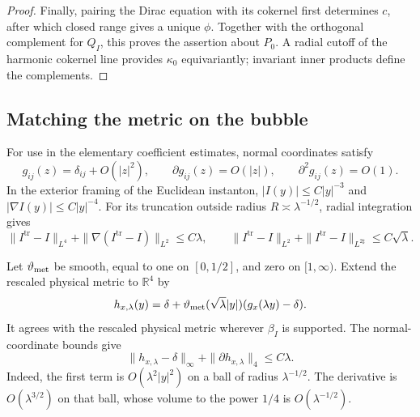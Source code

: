 \documentclass[11pt]{amsart}
\theoremstyle{definition}
\theoremstyle{remark}
\theoremstyle{plain}
\newcommand{\RR}{\mathbb{R}}
\begin{document}
\begin{proof}
Finally, pairing the Dirac equation with its cokernel first determines
$c$, after which closed range gives a unique $\phi$.  Together with
the orthogonal complement for $Q_I$, this proves the assertion about
$P_0$.  A radial cutoff of the harmonic cokernel line provides
$\kappa_0$ equivariantly; invariant inner products define the complements.
\end{proof}

\subsection{Matching the metric on the bubble}

For use in the elementary coefficient estimates, normal coordinates satisfy
\begin{equation}\label{eq:normal-coordinate-metric}
 g_{ij}(z)=\delta_{ij}+O(|z|^2),\qquad
 \partial g_{ij}(z)=O(|z|),\qquad \partial^2g_{ij}(z)=O(1).
\end{equation}
In the exterior framing of the Euclidean instanton,
$|I(y)|\leq C|y|^{-3}$ and $|\nabla I(y)|\leq C|y|^{-4}$.
For its truncation outside radius $R\asymp\lambda^{-1/2}$, radial
integration gives
\begin{equation}\label{eq:instanton-tail}
 \|I^{\mathrm{tr}}-I\|_{L^4}
 +\|\nabla(I^{\mathrm{tr}}-I)\|_{L^2}\leq C\lambda,
 \qquad
 \|I^{\mathrm{tr}}-I\|_{L^2}
 +\|I^{\mathrm{tr}}-I\|_{L^{2\sharp}}\leq C\sqrt\lambda.
\end{equation}

Let $\vartheta_{\rm met}$ be smooth, equal to one on $[0,1/2]$, and zero
on $[1,\infty)$.  Extend the rescaled physical metric to $\RR^4$ by
\begin{equation}\label{eq:euclidean-induced-metric}
 h_{x,\lambda}(y)=\delta+
 \vartheta_{\rm met}(\sqrt\lambda|y|)(g_x(\lambda y)-\delta).
\end{equation}
It agrees with the rescaled physical metric wherever $\beta_I$ is supported.
The normal-coordinate bounds give
\begin{equation}\label{eq:euclidean-metric-bound}
 \|h_{x,\lambda}-\delta\|_\infty+
 \|\partial h_{x,\lambda}\|_4\leq C\lambda.
\end{equation}
Indeed, the first term is $O(\lambda^2|y|^2)$ on a ball of radius
$\lambda^{-1/2}$.  The derivative is $O(\lambda^{3/2})$ on that
ball, whose volume to the power $1/4$ is $O(\lambda^{-1/2})$.
\end{document}
